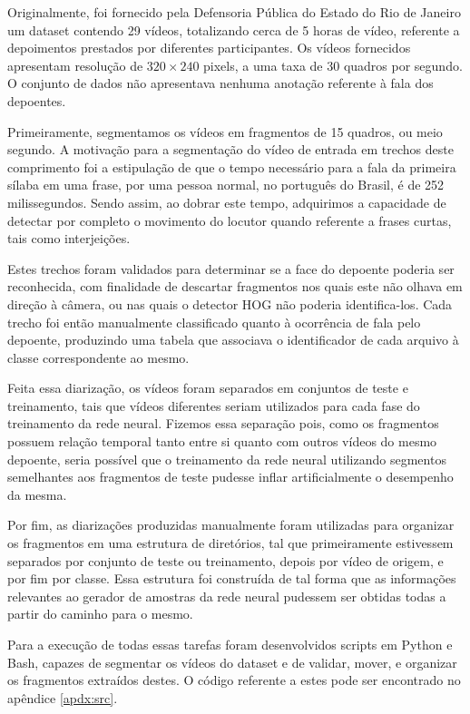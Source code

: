 Originalmente, foi fornecido pela Defensoria Pública do Estado do Rio de Janeiro um dataset contendo 29 vídeos, totalizando cerca de 5 horas de vídeo, referente a depoimentos prestados por diferentes participantes. Os vídeos fornecidos apresentam resolução de $320\times240$ pixels, a uma taxa de 30 quadros por segundo. O conjunto de dados não apresentava nenhuma anotação referente à fala dos depoentes.

Primeiramente, segmentamos os vídeos em fragmentos de 15 quadros, ou meio segundo. A motivação para a segmentação do vídeo de entrada em trechos deste comprimento foi a estipulação de que o tempo necessário para a fala da primeira sílaba em uma frase, por uma pessoa normal, no português do Brasil, é de 252 milissegundos\cite{barbosaSyllabletimingBrazilianPortuguese2000}. Sendo assim, ao dobrar este tempo, adquirimos a capacidade de detectar por completo o movimento do locutor quando referente a frases curtas, tais como interjeições.

Estes trechos foram validados para determinar se a face do depoente poderia ser reconhecida, com finalidade de descartar fragmentos nos quais este não olhava em direção à câmera, ou nas quais o detector HOG não poderia identifica-los. Cada trecho foi então manualmente classificado quanto à ocorrência de fala pelo depoente, produzindo uma tabela que associava o identificador de cada arquivo à classe correspondente ao mesmo.

Feita essa diarização, os vídeos foram separados em conjuntos de teste e treinamento, tais que vídeos diferentes seriam utilizados para cada fase do treinamento da rede neural. Fizemos essa separação pois, como os fragmentos possuem relação temporal tanto entre si quanto com outros vídeos do mesmo depoente, seria possível que o treinamento da rede neural utilizando segmentos semelhantes aos fragmentos de teste pudesse inflar artificialmente o desempenho da mesma.

Por fim, as diarizações produzidas manualmente foram utilizadas para organizar os fragmentos em uma estrutura de diretórios, tal que primeiramente estivessem separados por conjunto de teste ou treinamento, depois por vídeo de origem, e por fim por classe. Essa estrutura foi construída de tal forma que as informações relevantes ao gerador de amostras da rede neural pudessem ser obtidas todas a partir do caminho para o mesmo.

Para a execução de todas essas tarefas foram desenvolvidos scripts em Python e Bash, capazes de segmentar os vídeos do dataset e de validar, mover, e organizar os fragmentos extraídos destes. O código referente a estes pode ser encontrado no apêndice \ref{apdx:src}.

